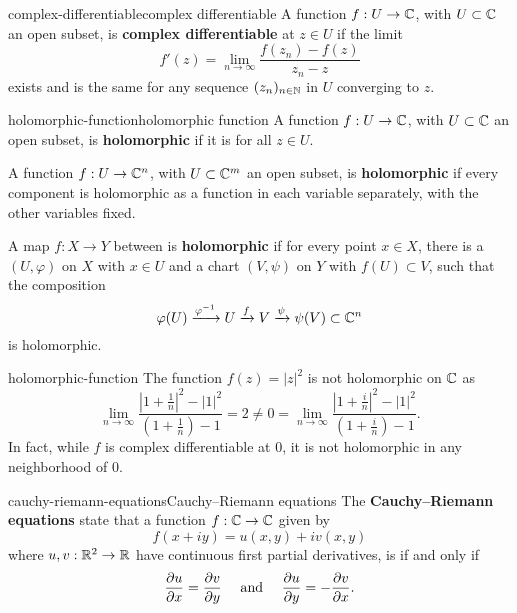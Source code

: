 \begin{topic}{complex-differentiable}{complex differentiable}
    A function $f : U \to \mathbb{C}$, with $U \subset \mathbb{C}$ an open subset, is \textbf{complex differentiable} at $z \in U$ if the limit
    \[ f'(z) = \lim_{n \to \infty} \frac{f(z_n) - f(z)}{z_n - z} \]
    exists and is the same for any sequence $(z_n)_{n \in \mathbb{N}}$ in $U$ converging to $z$.
\end{topic}

\begin{topic}{holomorphic-function}{holomorphic function}
    A function $f : U \to \mathbb{C}$, with $U \subset \mathbb{C}$ an open subset, is \textbf{holomorphic} if it is  for all $z \in U$.
    
    A function $f : U \to \mathbb{C}^n$, with $U \subset \mathbb{C}^m$ an open subset, is \textbf{holomorphic} if every component is holomorphic as a function in each variable separately, with the other variables fixed.
    
    A map $f : X \to Y$ between  is \textbf{holomorphic} if for every point $x \in X$, there is a  $(U, \varphi)$ on $X$ with $x \in U$ and a chart $(V, \psi)$ on $Y$ with $f(U) \subset V$, such that the composition
    \[ \varphi(U) \xrightarrow{\varphi^{-1}} U \xrightarrow{f} V \xrightarrow{\psi} \psi(V) \subset \mathbb{C}^n \]
    is holomorphic.
\end{topic}

\begin{example}{holomorphic-function}
    The function $f(z) = |z|^2$ is not holomorphic on $\mathbb{C}$ as
    \[ \lim_{n \to \infty} \frac{|1 + \tfrac{1}{n}|^2 - |1|^2}{(1 + \tfrac{1}{n}) - 1} = 2 \ne 0 = \lim_{n \to \infty} \frac{|1 + \tfrac{i}{n}|^2 - |1|^2}{(1 + \tfrac{i}{n}) - 1} . \]
    In fact, while $f$ is complex differentiable at $0$, it is not holomorphic in any neighborhood of $0$.
\end{example}

\begin{topic}{cauchy-riemann-equations}{Cauchy--Riemann equations}
    The \textbf{Cauchy--Riemann equations} state that a function $f : \mathbb{C} \to \mathbb{C}$ given by
    \[ f(x + iy) = u(x, y) + i v(x, y) \]
    where $u, v : \mathbb{R}^2 \to \mathbb{R}$ have continuous first partial derivatives, is  if and only if
    \[ \frac{\partial u}{\partial x} = \frac{\partial v}{\partial y} \quad \textup{ and } \quad \frac{\partial u}{\partial y} = - \frac{\partial v}{\partial x} . \]
\end{topic}

